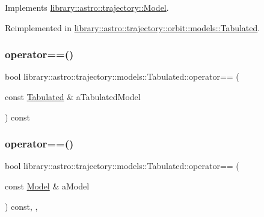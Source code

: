 Implements \hyperlink{classlibrary_1_1astro_1_1trajectory_1_1_model_a476c234f5fca1eb75f64f5a96fd83c61}{library\+::astro\+::trajectory\+::\+Model}.



Reimplemented in \hyperlink{classlibrary_1_1astro_1_1trajectory_1_1orbit_1_1models_1_1_tabulated_a4373b98c6026c999da98e1740c784e17}{library\+::astro\+::trajectory\+::orbit\+::models\+::\+Tabulated}.

\mbox{\label{classlibrary_1_1astro_1_1trajectory_1_1models_1_1_tabulated_abd07a40a7c4d5dacc8e454d78680b683}} 
\subsubsection{\texorpdfstring{operator==()}{operator==()}\hspace{0.1cm}{\footnotesize\ttfamily [1/2]}}
{\footnotesize\ttfamily bool library\+::astro\+::trajectory\+::models\+::\+Tabulated\+::operator== (\begin{DoxyParamCaption}\item[{const \hyperlink{classlibrary_1_1astro_1_1trajectory_1_1models_1_1_tabulated}{Tabulated} \&}]{a\+Tabulated\+Model }\end{DoxyParamCaption}) const}

\mbox{\label{classlibrary_1_1astro_1_1trajectory_1_1models_1_1_tabulated_af733fafd705bd6a1f204acdbaf2e9646}} 
\subsubsection{\texorpdfstring{operator==()}{operator==()}\hspace{0.1cm}{\footnotesize\ttfamily [2/2]}}
{\footnotesize\ttfamily bool library\+::astro\+::trajectory\+::models\+::\+Tabulated\+::operator== (\begin{DoxyParamCaption}\item[{const \hyperlink{classlibrary_1_1astro_1_1trajectory_1_1_model}{Model} \&}]{a\+Model }\end{DoxyParamCaption}) const\hspace{0.3cm}{\ttfamily [override]}, {\ttfamily [protected]}, {\ttfamily [virtual]}}



